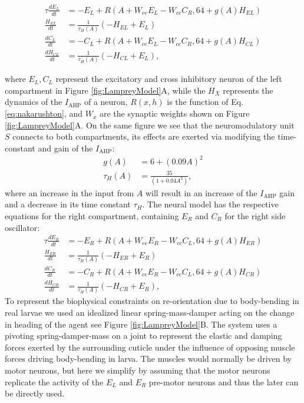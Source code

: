 \documentclass[11pt,a4paper]{article}
\begin{document}
\begin{align}
\tau \frac{dE_L}{dt} & = - E_L +  R( A + W_{ee} E_L - W_{cc}C_R, 64 + g(A)H_{EL})\\
\frac{H_{EL}}{dt} &= \frac{1}{\tau_H(A)}(-H_{EL}+E_L)\\
\frac{dC_L}{dt} &= -C_L + R(A + W_{ce}E_L - W_{cc}C_R, 64+g(A)H_{CL})\\
\frac{dH_{CL}}{dt} &= \frac{1}{\tau_H(A)}(-H_{CL}+E_L),
\end{align}

where $E_L, C_L$ represent the excitatory and cross inhibitory neuron of the left compartment in Figure \ref{fig:LampreyModel}A, while the $H_{X}$ represents the dynamics of the $I_{\text{AHP}}$ of a neuron, $R(x,h)$ is the \cite{naka1966s} function of Eq. \eqref{eq:nakarushton}, and $W_x$ are the synaptic weights shown on Figure  \ref{fig:LampreyModel}A. On the same figure we see that the neuromodulatory unit $S$ connects to both compartments, its effects are exerted via modifying the time-constant and gain of the $I_{\text{AHP}}$:
\begin{align}
g(A) &= 6 + \left( 0.09A \right)^2\\
\tau_H(A) &= \frac{35}{(1 + 0.04 A^2)},
\end{align}
where an increase in the input from $A$ will result in an increase of the $I_{\text{AHP}}$ gain and a decrease in its time constant $\tau_H$.
 The neural model has the respective equations for the right compartment, containing  $E_R$ and $C_R$ for the right side oscillator:
\begin{align}
\tau \frac{dE_R}{dt} & = - E_R +  R( A + W_{ee} E_R - W_{cc}C_L, 64 + g(A)H_{ER})\\
\frac{H_{ER}}{dt} &= \frac{1}{\tau_H(A)}(-H_{ER}+E_R)\\
\frac{dC_R}{dt} &= -C_R + R( A + W_{ce}E_R - W_{cc}C_L, 64+g(A)H_{CR})\\
\frac{dH_{CR}}{dt} &= \frac{1}{\tau_H(A)}(-H_{CR}+E_R),
\end{align}
To represent the biophysical constraints on re-orientation due to body-bending in real larvae we  used an idealized linear spring-mass-damper acting on the change in heading of the agent see Figure \ref{fig:LampreyModel}B.
The system uses a pivoting spring-damper-mass on a joint to represent the elastic and damping forces exerted by the surrounding cuticle under the influence of opposing muscle forces driving body-bending in larva.
 The muscles would normally be driven by motor neurons, but here we simplify by assuming that the motor neurons replicate the activity of the $E_L$ and $E_R$ pre-motor neurons and thus the later can be directly used.
\end{document}
